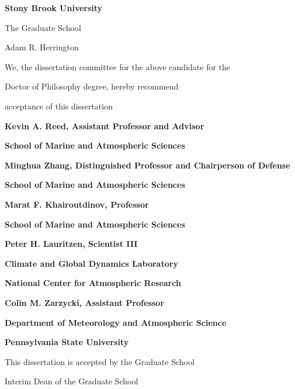 \documentclass[12pt]{article}
\begin{document}
\centerline{\bf{Stony Brook University}}
\vspace*{1\baselineskip}
\centerline{The Graduate School}
\vspace*{2\baselineskip}
\centerline{Adam R. Herrington}
\vspace*{2\baselineskip}
\centerline{We, the dissertation committee for the above candidate for the}
\vspace*{1\baselineskip}
\centerline{Doctor of Philosophy degree, hereby recommend}
\vspace*{1\baselineskip}
\centerline{acceptance of this dissertation}
\vspace*{2\baselineskip}
\centerline{\bf{Kevin A. Reed, Assistant Professor and Advisor}}
\centerline{\bf{School of Marine and Atmospheric Sciences}}
\vspace*{1\baselineskip}
\centerline{\bf{Minghua Zhang, Distinguished Professor and Chairperson of Defense}}
\centerline{\bf{School of Marine and Atmospheric Sciences}}
\vspace*{1\baselineskip}
\centerline{\bf{Marat F. Khairoutdinov, Professor}}
\centerline{\bf{School of Marine and Atmospheric Sciences}}
\vspace*{1\baselineskip}
\centerline{\bf{Peter H. Lauritzen, Scientist III}}
\centerline{\bf{Climate and Global Dynamics Laboratory}} 
\centerline{\bf{National Center for Atmospheric Research}}
\vspace*{1\baselineskip}
\centerline{\bf{Colin M. Zarzycki, Assistant Professor}}
\centerline{\bf{Department of Meteorology and Atmospheric Science}} 
\centerline{\bf{Pennsylvania State University}}
\vspace*{2\baselineskip}
\centerline{This dissertation is accepted by the Graduate School}
\vspace*{3\baselineskip}
\centerline{Interim Dean of the Graduate School}
\end{document}
